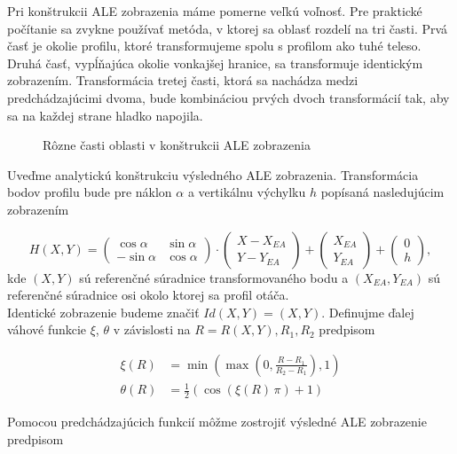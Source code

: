 Pri konštrukcii ALE zobrazenia máme pomerne veľkú voľnosť. Pre praktické
počítanie sa zvykne používať metóda, v ktorej sa oblasť rozdelí na tri časti.
Prvá časť je okolie profilu, ktoré transformujeme spolu s profilom ako tuhé
teleso. Druhá časť, vypĺňajúca okolie vonkajšej hranice, sa transformuje 
identickým zobrazením. Transformácia tretej časti, ktorá sa nachádza medzi
predchádzajúcimi dvoma, bude kombináciou prvých dvoch transformácií tak, aby
sa na každej strane hladko napojila. 

\begin{figure}[h]
  \begin{center}
    \caption{Rôzne časti oblasti v konštrukcii ALE zobrazenia}
    \label{si-im-ale=domains}
  \end{center}
\end{figure}

Uveďme analytickú konštrukciu výsledného ALE zobrazenia. Transformácia bodov profilu
bude pre náklon $\alpha$ a vertikálnu výchylku $h$ popísaná nasledujúcim
zobrazením 

\[
H(X,Y)=
\left( \begin{array}{cc}
\cos \alpha & \sin \alpha \\
-\sin \alpha & \cos \alpha \end{array} \right) 
\cdot \left( \begin{array}{c}
X-X_{EA} \\
Y-Y_{EA} \end{array} \right)
+ \left( \begin{array}{c}
X_{EA} \\
Y_{EA} \end{array} \right)
+ \left( \begin{array}{c}
0 \\
h \end{array} \right),
\]
kde $(X,Y)$ sú referenčné súradnice transformovaného bodu a 
$(X_{EA},Y_{EA})$ sú referenčné súradnice osi okolo ktorej sa profil otáča.\\
Identické zobrazenie budeme značiť $Id(X,Y)=(X,Y)$. 
Definujme ďalej váhové funkcie $\xi$, $\theta$ v závislosti na
$R=R(X,Y),R_1,R_2$ predpisom

\[
\begin{split}
\xi(R)&=\min\left(\max\left(0,\frac{R-R_1}{R_2-R_1}\right),1\right) \\
\theta(R)&=\frac{1}{2}\left(\cos(\xi(R)\,\pi)+1\right)
\end{split}
\]
 
 Pomocou predchádzajúcich funkcií môžme zostrojiť výsledné ALE zobrazenie
 predpisom 
 
